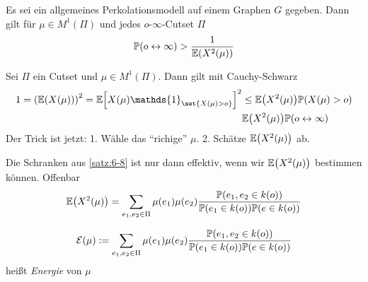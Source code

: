 \begin{satz}
	\label{satz:6-8}
	Es sei ein allgemeines Perkolationsmodell auf einem Graphen $G$ gegeben. Dann gilt für $\mu \in M^1(\Pi)$ und jedes $o$-$\infty$-Cutset $\Pi$
	\begin{align}
		\propE{o \leftrightarrow \infty} > \frac{1}{\EW{X^2(\mu)}}
	\end{align}
\end{satz}
\begin{beweis}
	Sei $\Pi$ ein Cutset und $\mu \in M^1(\Pi)$. Dann gilt mit Cauchy-Schwarz
	\begin{align}
		1 = \enb{\EW{X(\mu)}}^2 = \EWE{X(\mu) \mathds{1}_{\set{X(\mu) > o}}}^2 &\leq \EW{X^2(\mu)} \prop{X(\mu) > o} \\
							& \EW{X^2(\mu)} \prop{o \leftrightarrow \infty} 
	\end{align}
	Der Trick ist jetzt: 1. Wähle das \enquote{richige} $\mu$. 2. Schätze $\EW{X^2(\mu)}$ ab.
\end{beweis}

Die Schranken aus \autoref{satz:6-8} ist nur dann effektiv, wenn wir $\EW{X^2(\mu)}$ bestimmen können. Offenbar
\begin{align}
	\EW{X^2(\mu)} = \sum\limits_{e_1,e_2 \in \Pi} \mu(e_1) \mu(e_2) \frac{\prop{e_1,e_2 \in k(o)}}{\prop{e_1 \in k(o)} \prop{e \in k(o)}}
\end{align}

\begin{definition}
	\begin{align}
		\mathcal{E}(\mu) := \sum\limits_{e_1,e_2 \in \Pi} \mu(e_1) \mu(e_2) \frac{\prop{e_1,e_2 \in k(o)}}{\prop{e_1 \in k(o)} \prop{e \in k(o)}}
	\end{align}
	heißt \emph{Energie} von $\mu$
\end{definition}

